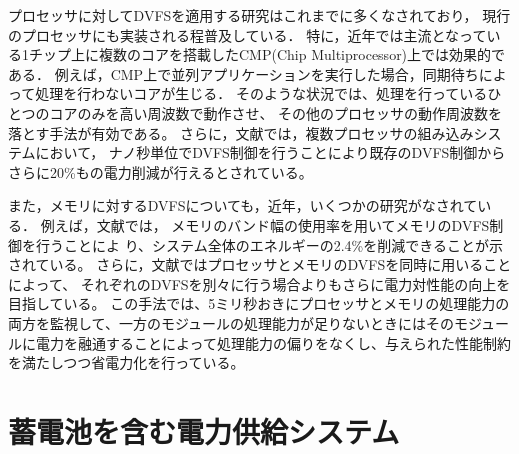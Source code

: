 プロセッサに対してDVFSを適用する研究はこれまでに多くなされており，
現行のプロセッサにも実装される程普及している．
特に，近年では主流となっている1チップ上に複数のコアを搭載したCMP(Chip Multiprocessor)上では効果的である．
例えば，CMP上で並列アプリケーションを実行した場合，同期待ちによって処理を行わないコアが生じる．
そのような状況では、処理を行っているひとつのコアのみを高い周波数で動作させ、
その他のプロセッサの動作周波数を落とす手法が有効である。
さらに，文献\cite{4658633}では，複数プロセッサの組み込みシステムにおいて，
ナノ秒単位でDVFS制御を行うことにより既存のDVFS制御からさらに20\%もの電力削減が行えるとされている。


また，メモリに対するDVFSについても，近年，いくつかの研究がなされている．
例えば，文献\cite{David:2011:MPM:1998582.1998590}では，
メモリのバンド幅の使用率を用いてメモリのDVFS制御を行うことによ
り、システム全体のエネルギーの2.4\%を削減できることが示されている。
さらに，文献\cite{6493615}ではプロセッサとメモリのDVFSを同時に用いることによって、
それぞれのDVFSを別々に行う場合よりもさらに電力対性能の向上を目指している。
この手法では、5ミリ秒おきにプロセッサとメモリの処理能力の両方を監視して、一方のモジュールの処理能力が足りないときにはそのモジュールに電力を融通することによって処理能力の偏りをなくし、与えられた性能制約を満たしつつ省電力化を行っている。










\section{蓄電池を含む電力供給システム}
\label{sec:ups}

